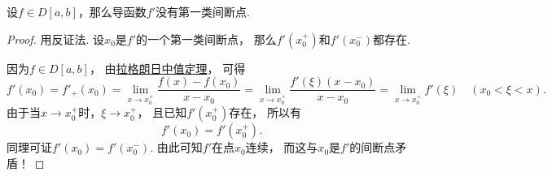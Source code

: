 \begin{theorem}
设\(f \in D[a,b]\)，那么导函数\(f'\)没有第一类间断点.
\begin{proof}
用反证法.
设\(x_0\)是\(f'\)的一个第一类间断点，
那么\(f'(x_0^+)\)和\(f'(x_0^-)\)都存在.

因为\(f \in D[a,b]\)，
由\hyperref[theorem:微分中值定理.拉格朗日中值定理]{拉格朗日中值定理}，
可得\[
	f'(x_0)
	= f'_+(x_0)
	= \lim_{x \to x_0^+} \frac{f(x)-f(x_0)}{x-x_0}
	= \lim_{x \to x_0^+} \frac{f'(\xi) (x-x_0)}{x-x_0}
	= \lim_{x \to x_0^+} f'(\xi)
	\quad(x_0<\xi<x).
\]
由于当\(x \to x_0^+\)时，\(\xi \to x_0^+\)，
且已知\(f'(x_0^+)\)存在，
所以有\[
	f'(x_0)=f'(x_0^+).
\]
同理可证\(f'(x_0)=f'(x_0^-)\).
由此可知\(f'\)在点\(x_0\)连续，
而这与\(x_0\)是\(f'\)的间断点矛盾！
\end{proof}
\end{theorem}

